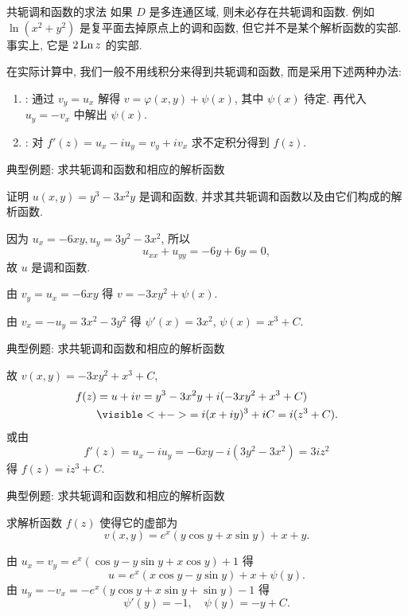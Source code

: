 \begin{frame}{共轭调和函数的求法}
\onslide<+->
如果 $D$ 是多连通区域, 则未必存在共轭调和函数.
\onslide<+->
例如 $\ln(x^2+y^2)$ 是复平面去掉原点上的调和函数, 但它并不是某个解析函数的实部.
\onslide<+->
事实上, 它是 $2\operatorname{Ln} z$ 的实部.

\onslide<+->
在实际计算中, 我们一般不用线积分来得到共轭调和函数, 而是采用下述两种办法:
\begin{enumerate}
\item {}: 通过 $v_y=u_x$ 解得 $v=\varphi(x,y)+\psi(x)$, 其中 $\psi(x)$ 待定.
\onslide<+->
再代入 $u_y=-v_x$ 中解出 $\psi(x)$.
\item {}: 对 $f'(z)=u_x-iu_y=v_y+iv_x$ 求不定积分得到 $f(z)$.
\end{enumerate}
\end{frame}


\begin{frame}{典型例题: 求共轭调和函数和相应的解析函数}
\begin{example}
证明 $u(x,y)=y^3-3x^2y$ 是调和函数, 并求其共轭调和函数以及由它们构成的解析函数.
\end{example}
\begin{solution}
\indent
因为 $u_x=-6xy,u_y=3y^2-3x^2$,
\onslide<+->
所以
\[u_{xx}+u_{yy}=-6y+6y=0,\]
\onslide<+->
故 $u$ 是调和函数.

\indent
\onslide<+->
由 $v_y=u_x=-6xy$ 得 $v=-3xy^2+\psi(x)$.

\indent
\onslide<+->
由 $v_x=-u_y=3x^2-3y^2$ 得 $\psi'(x)=3x^2$,
\onslide<+->
$\psi(x)=x^3+C$.
\end{solution}
\end{frame}


\begin{frame}{典型例题: 求共轭调和函数和相应的解析函数}
\begin{solutionc}
\indent
故 $v(x,y)=-3xy^2+x^3+C$,
\onslide<+->
\begin{align*}
f(z)&=u+iv=y^3-3x^2y+i(-3xy^2+x^3+C)\\
&\visible<+->{=i(x+iy)^3+iC=i(z^3+C).}
\end{align*}
\onslide<+->
或由
\[f'(z)=u_x-iu_y=-6xy-i(3y^2-3x^2)=3iz^2\]
得 $f(z)=iz^3+C$.
\end{solutionc}
\end{frame}


\begin{frame}{典型例题: 求共轭调和函数和相应的解析函数}
\begin{example}
求解析函数 $f(z)$ 使得它的虚部为
\[v(x,y)=e^x(y\cos y+x\sin y)+x+y.\]
\end{example}
\begin{solution}
由 $u_x=v_y=e^x(\cos y-y\sin y+x\cos y)+1$ 得
\[u=e^x(x\cos y-y\sin y)+x+\psi(y).\]
\onslide<+->
由 $u_y=-v_x=-e^x(y\cos y+x\sin y+\sin y)-1$ 得
\[\psi'(y)=-1,\quad\psi(y)=-y+C.\]
\end{solution}
\end{frame}


